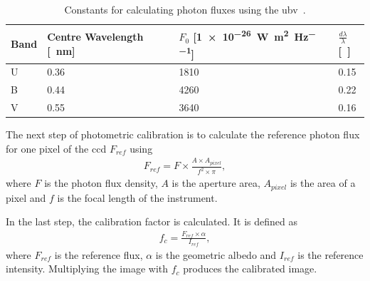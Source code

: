 \begin{table}[htb]
    \centering
    \caption{Constants for calculating photon fluxes using the \gls{ubv}~\cite{Bessell1979UBVRIPhotometry}.}
    \label{tab:ubv_constants}
    \begin{tabular}{l|l|l|l}
        \textbf{Band} & \textbf{Centre Wavelength [\SI{}{\nano\meter}]} & \textbf{$F_0$ [\SI{1e-26}{\watt\per\square\meter\per\hertz}]} & \textbf{$\frac{d\lambda}{\lambda}$}[~] \\ \hline
        U             & 0.36                       & 1810        & 0.15             \\
        B             & 0.44                       & 4260        & 0.22             \\
        V             & 0.55                       & 3640        & 0.16            
    \end{tabular}
\end{table}

The next step of photometric calibration is to calculate the reference photon flux for one pixel of the \gls{ccd} $F_{ref}$ using
\begin{align}
    F_{ref} = F \times \frac{A \times A_{pixel}}{f^2 \times \pi}, \label{eq:comp_flux_pix}
\end{align}
where $F$ is the photon flux density, $A$ is the aperture area, $A_{pixel}$ is the area of a pixel and $f$ is the focal length of the instrument.

In the last step, the calibration factor is calculated. It is defined as
\begin{align}
    f_c = \frac{F_{ref} \times \alpha}{I_{ref}}, \label{eq:comp_cal_fac}
\end{align}
where $F_{ref}$ is the reference flux, $\alpha$ is the geometric albedo and $I_{ref}$ is the reference intensity. Multiplying the image with $f_c$ produces the calibrated image.

